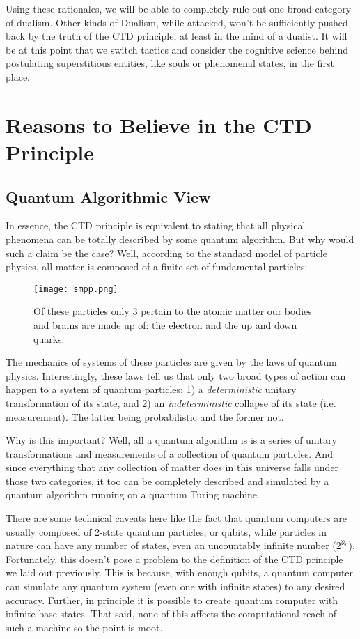 \documentclass[11pt]{diazessay} %
\begin{document}
		Using these rationales, we will be able to completely rule out one broad category of dualism. Other kinds of Dualism, while attacked, won't be sufficiently pushed back by the truth of the CTD principle, at least in the mind of a dualist. It will be at this point that we switch tactics and consider the cognitive science behind postulating superstitious entities, like souls or phenomenal states, in the first place.


\section{Reasons to Believe in the CTD Principle}
	\subsection{Quantum Algorithmic View}
		In essence, the CTD principle is equivalent to stating that all physical phenomena can be totally described by some quantum algorithm. But why would such a claim be the case? Well, according to the standard model of particle physics, all matter is composed of a finite set of fundamental particles:

		\begin{figure}[H]
			\centering
			\texttt{[image: smpp.png]}
			\captionsetup{justification=centering,margin=.7cm}
			\caption{Of these particles only 3 pertain to the atomic matter our bodies and brains are made up of: the electron and the up and down quarks.}
		\end{figure}

		The mechanics of systems of these particles are given by the laws of quantum physics. Interestingly, these laws tell us that only two broad types of action can happen to a system of quantum particles: 1) a \emph{deterministic} unitary transformation of its state, and 2) an \emph{indeterministic} collapse of its state (i.e. measurement). The latter being probabilistic and the former not.

		Why is this important? Well, all a quantum algorithm is is a series of unitary transformations and measurements of a collection of quantum particles. And since everything that any collection of matter does in this universe falls under those two categories, it too can be completely described and simulated by a quantum algorithm running on a quantum Turing machine.

		There are some technical caveats here like the fact that quantum computers are usually composed of 2-state quantum particles, or qubits, while particles in nature can have any number of states, even an uncountably infinite number ($2^{\aleph_0}$). Fortunately, this doesn't pose a problem to the definition of the CTD principle we laid out previously. This is because, with enough qubits, a quantum computer can simulate any quantum system (even one with infinite states) to any desired accuracy. Further, in principle it is possible to create quantum computer with infinite base states. That said, none of this affects the computational reach of such a machine so the point is moot.
\end{document}
